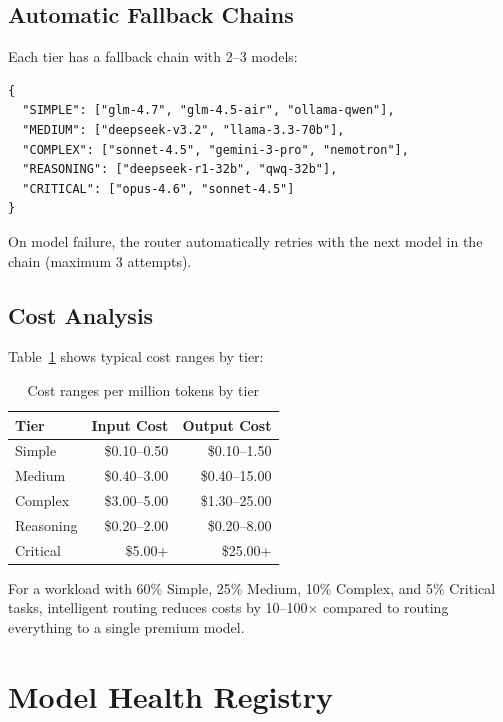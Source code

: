 \documentclass[conference]{IEEEtran}
\begin{document}
\subsection{Automatic Fallback Chains}

Each tier has a fallback chain with 2--3 models:

\begin{lstlisting}[style=jsoncode]
{
  "SIMPLE": ["glm-4.7", "glm-4.5-air", "ollama-qwen"],
  "MEDIUM": ["deepseek-v3.2", "llama-3.3-70b"],
  "COMPLEX": ["sonnet-4.5", "gemini-3-pro", "nemotron"],
  "REASONING": ["deepseek-r1-32b", "qwq-32b"],
  "CRITICAL": ["opus-4.6", "sonnet-4.5"]
}
\end{lstlisting}

On model failure, the router automatically retries with the next model in the chain (maximum 3 attempts).

\subsection{Cost Analysis}

Table~\ref{tab:cost} shows typical cost ranges by tier:

\begin{table}[h]
\centering
\caption{Cost ranges per million tokens by tier}
\label{tab:cost}
\begin{tabular}{lrr}
\toprule
\textbf{Tier} & \textbf{Input Cost} & \textbf{Output Cost} \\
\midrule
Simple & \$0.10--0.50 & \$0.10--1.50 \\
Medium & \$0.40--3.00 & \$0.40--15.00 \\
Complex & \$3.00--5.00 & \$1.30--25.00 \\
Reasoning & \$0.20--2.00 & \$0.20--8.00 \\
Critical & \$5.00+ & \$25.00+ \\
\bottomrule
\end{tabular}
\end{table}

For a workload with 60\% Simple, 25\% Medium, 10\% Complex, and 5\% Critical tasks, intelligent routing reduces costs by 10--100$\times$ compared to routing everything to a single premium model.



\section{Model Health Registry}
\label{sec:health}
\end{document}
